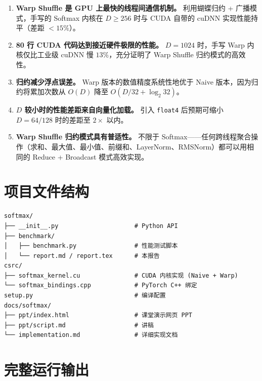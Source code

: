 \documentclass[12pt,a4paper]{ctexart}
\begin{document}
\begin{enumerate}[itemsep=6pt]
    \item \textbf{Warp Shuffle 是 GPU 上最快的线程间通信机制。} 利用蝴蝶归约 + 广播模式，手写的 Softmax 内核在 $D \geq 256$ 时与 CUDA 自带的 cuDNN 实现性能持平（差距 $<15\%$）。

    \item \textbf{80 行 CUDA 代码达到接近硬件极限的性能。} $D=1024$ 时，手写 Warp 内核仅比工业级 cuDNN 慢 $13\%$，充分证明了 Warp Shuffle 归约模式的高效性。

    \item \textbf{归约减少浮点误差。} Warp 版本的数值精度系统性地优于 Naive 版本，因为归约将累加次数从 $O(D)$ 降至 $O(D/32 + \log_2 32)$。

    \item \textbf{$D$ 较小时的性能差距来自向量化加载。} 引入 \texttt{float4} 后预期可缩小 $D=64/128$ 时的差距至 $2\times$ 以内。

    \item \textbf{Warp Shuffle 归约模式具有普适性。} 不限于 Softmax——任何跨线程聚合操作（求和、最大值、最小值、前缀和、LayerNorm、RMSNorm）都可以用相同的 Reduce + Broadcast 模式高效实现。
\end{enumerate}

\appendix
\section{项目文件结构}

\begin{verbatim}
softmax/
├── __init__.py                     # Python API
├── benchmark/
│   ├── benchmark.py                # 性能测试脚本
│   └── report.md / report.tex      # 本报告
csrc/
├── softmax_kernel.cu               # CUDA 内核实现 (Naive + Warp)
└── softmax_bindings.cpp            # PyTorch C++ 绑定
setup.py                            # 编译配置
docs/softmax/
├── ppt/index.html                  # 课堂演示网页 PPT
├── ppt/script.md                   # 讲稿
└── implementation.md               # 详细实现文档
\end{verbatim}

\section{完整运行输出}
\end{document}
